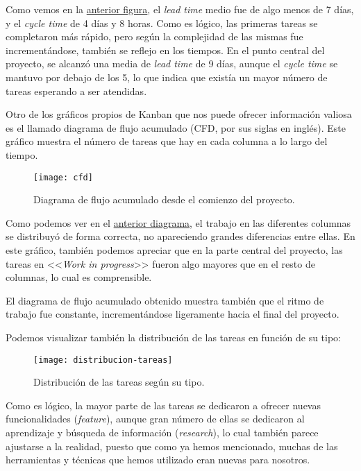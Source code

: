 Como vemos en la \hyperref[average-lead-cycle]{anterior figura}, el \emph{lead time} medio fue de algo menos de 7 días, y el \emph{cycle time} de 4 días y 8 horas. Como es lógico, las primeras tareas se completaron más rápido, pero según la complejidad de las mismas fue incrementándose, también se reflejo en los tiempos. En el punto central del proyecto, se alcanzó una media de \emph{lead time} de 9 días, aunque el \emph{cycle time} se mantuvo por debajo de los 5, lo que indica que existía un mayor número de tareas esperando a ser atendidas.

Otro de los gráficos propios de Kanban que nos puede ofrecer información valiosa es el llamado diagrama de flujo acumulado (CFD, por sus siglas en inglés). Este gráfico muestra el número de tareas que hay en cada columna a lo largo del tiempo.

\begin{figure}[h]
	\centering
	\texttt{[image: cfd]}
	\vspace{-0.7cm}
	\caption{Diagrama de flujo acumulado desde el comienzo del proyecto.}
	\label{cfd}
\end{figure}

Como podemos ver en el \hyperref[cfd]{anterior diagrama}, el trabajo en las diferentes columnas se distribuyó de forma correcta, no apareciendo grandes diferencias entre ellas. En este gráfico, también podemos apreciar que en la parte central del proyecto, las tareas en <<\emph{Work in progress}>> fueron algo mayores que en el resto de columnas, lo cual es comprensible.

El diagrama de flujo acumulado obtenido muestra también que el ritmo de trabajo fue constante, incrementándose ligeramente hacia el final del proyecto.

Podemos visualizar también la distribución de las tareas en función de su tipo:

\begin{figure}[h]
	\centering
	\texttt{[image: distribucion-tareas]}
	\caption{Distribución de las tareas según su tipo.}
\end{figure}

Como es lógico, la mayor parte de las tareas se dedicaron a ofrecer nuevas funcionalidades (\emph{feature}), aunque gran número de ellas se dedicaron al aprendizaje y búsqueda de información (\emph{research}), lo cual también parece ajustarse a la realidad, puesto que como ya hemos mencionado, muchas de las herramientas y técnicas que hemos utilizado eran nuevas para nosotros. 

